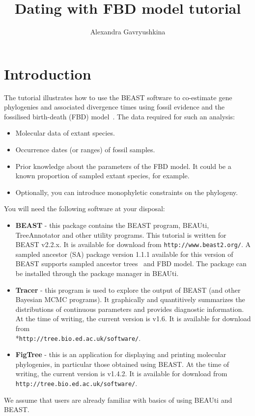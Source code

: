 \documentclass[12pt]{article}
\title{Dating with FBD model tutorial}
\author{Alexandra Gavryushkina}
\date{}
\newcommand{\BEASTVersion}{2.2.x}
\newcommand{\TracerVersion}{1.6}
\newcommand{\FigTreeVersion}{1.4.2}
\begin{document}
\maketitle


\section{Introduction}

The tutorial illustrates how to use the BEAST software to co-estimate gene phylogenies and associated divergence times using fossil evidence and the fossilised birth-death (FBD) model~\cite{gavr2014}. 
The data required for such an analysis:

\begin{itemize}

\item Molecular data of extant species. 

\item Occurrence dates (or ranges) of fossil samples.

\item Prior knowledge about the parameters of the FBD model. It could be a known proportion of sampled extant species, for example.

\item Optionally, you can introduce monophyletic constraints on the phylogeny. 

\end{itemize}

You will need the following software at your disposal: 

\begin{itemize}

\item {\bf BEAST} - this package contains the BEAST program, BEAUti, TreeAnnotator and other utility programs. This tutorial is written for BEAST v{\BEASTVersion}. It is available for download from \texttt{http://www.beast2.org/}.  A sampled ancestor (SA) package version 1.1.1 available for this version of BEAST supports sampled ancestor trees~\cite{gavr2014} and FBD model. The package can be installed through the package manager in BEAUti.  
\item {\bf Tracer} - this program is used to explore the output of BEAST (and other Bayesian MCMC programs). It graphically and
quantitively summarizes the distributions of continuous parameters and provides diagnostic information. At the time of
writing, the current version is v{\TracerVersion}. It is available for download from\\*\texttt{http://tree.bio.ed.ac.uk/software/}.
\item {\bf FigTree} - this is an application for displaying and printing molecular phylogenies, in particular those obtained using
BEAST. At the time of writing, the current version is v{\FigTreeVersion}. It is available for download from \texttt{http://tree.bio.ed.ac.uk/software/}.
\end{itemize}
We assume that users are already familiar with basics of using BEAUti and BEAST. 
\end{document}
